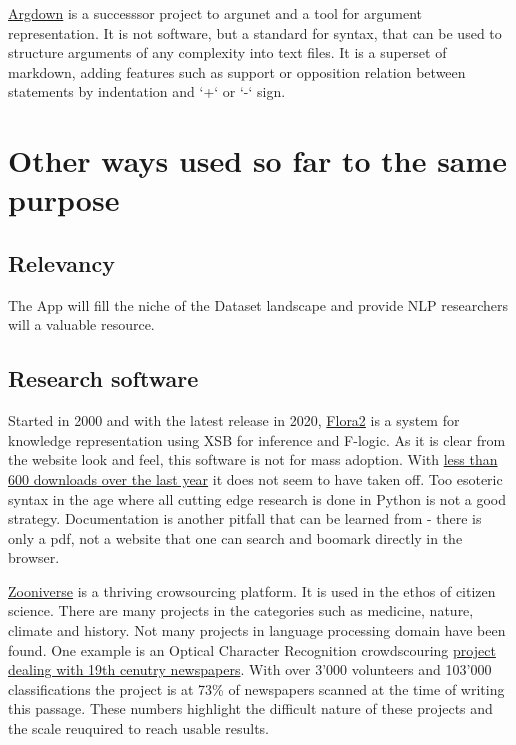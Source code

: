 \documentclass{report}
\begin{document}
\href{https://argdown.org/}{Argdown} is a successsor project to argunet and a tool for argument representation. It is not software, but a standard for syntax, that can be used to structure arguments of any complexity into text files. It is a superset of markdown, adding features such as support or opposition relation between statements by indentation and `+` or `-` sign.

\section{Other ways used so far to the same purpose}

\subsection{Relevancy}
The App will fill the niche of the Dataset landscape and provide NLP researchers will a valuable resource.

\subsection{Research software}

Started in 2000 and with the latest release in 2020,
\href{https://flora.sourceforge.net/}{Flora2} is a system for knowledge representation using XSB for inference and F-logic.
As it is clear from the website look and feel, this software is not for mass adoption.
With \href{https://sourceforge.net/projects/flora/files/stats/timeline?dates=2021-12-04\%20to\%202022-12-03&period=daily}{less than 600 downloads over the last year} it does not seem to have taken off.
Too esoteric syntax in the age where all cutting edge research is done in Python is not a good strategy. Documentation is another pitfall that can be learned from - there is only a pdf, not a website that one can search and boomark directly in the browser. 

\href{https://www.zooniverse.org/projects}{Zooniverse} is a thriving crowsourcing platform. It is used in the ethos of citizen science. There are many projects in the categories such as medicine, nature, climate and history.  Not many projects in language processing domain have been found. One example is an Optical Character Recognition crowdscouring \href{https://www.zooniverse.org/projects/bldigital/living-with-machines}{project dealing with 19th cenutry newspapers}. With over 3'000 volunteers and 103'000 classifications the project is at 73\% of newspapers scanned at the time of writing this passage.
These numbers highlight the difficult nature of these projects and the scale reuquired to reach usable results.
\end{document}
